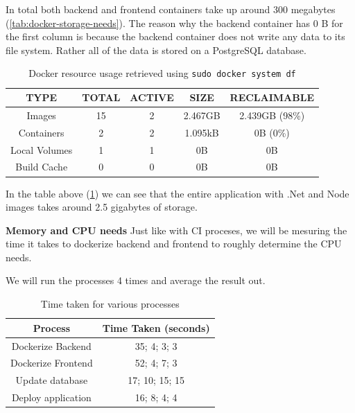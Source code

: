\documentclass[]{VUMIFTemplateClass}
\begin{document}
In total both backend and frontend containers take up around 300 megabytes (\ref{tab:docker-storage-needs}). 
The reason why the backend container has 0 B for the first column is because the backend container does not write any data to its file system. 
Rather all of the data is stored on a PostgreSQL database.

\begin{table}[H]
    \centering
    \begin{tabular}{|c|c|c|c|c|}
        \hline
        \textbf{TYPE} & \textbf{TOTAL} & \textbf{ACTIVE} & \textbf{SIZE} & \textbf{RECLAIMABLE} \\ 
        \hline
        Images & 15 & 2 & 2.467GB & 2.439GB (98\%) \\ 
        \hline
        Containers & 2 & 2 & 1.095kB & 0B (0\%) \\ 
        \hline
        Local Volumes & 1 & 1 & 0B & 0B \\ 
        \hline
        Build Cache & 0 & 0 & 0B & 0B \\ 
        \hline
    \end{tabular}
    \caption{Docker resource usage retrieved using \texttt{sudo docker system df}}
    \label{tab:docker-resource-usage}
\end{table}

In the table above (\ref{tab:docker-resource-usage}) we can see that the entire application with .Net and Node images takes around 2.5 gigabytes of storage.


\textbf{Memory and CPU needs}
Just like with CI proceses, we will be mesuring the time it takes to dockerize backend and frontend to roughly determine the CPU needs.

We will run the processes 4 times and average the result out.

\begin{table}[H]
    \centering
    \begin{tabular}{|c|c|}
        \hline
        \textbf{Process} & \textbf{Time Taken (seconds)} \\
        \hline
        Dockerize Backend & 35; 4; 3; 3 \\
        \hline
        Dockerize Frontend & 52; 4; 7; 3 \\
        \hline
        Update database & 17; 10; 15; 15 \\
        \hline
        Deploy application & 16; 8; 4; 4 \\
        \hline
    \end{tabular}
    \caption{Time taken for various processes}
    \label{tab:dockerize-process-time}
\end{table}
\end{document}
